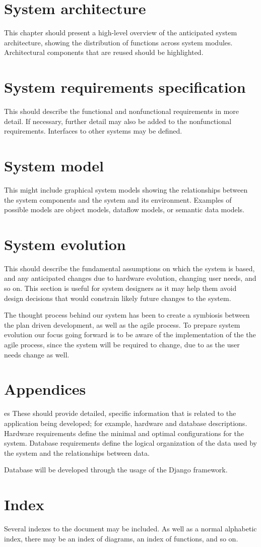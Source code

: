 \documentclass{article}
\begin{document}
\section*{System architecture}
This chapter should present a high-level overview of the anticipated system architecture, showing the
distribution of functions across system modules. Architectural components that are reused should be
highlighted.

\section*{System requirements specification}
This should describe the functional and nonfunctional requirements in more detail. If necessary,
further detail may also be added to the nonfunctional requirements. Interfaces to other systems may be
defined.

\section*{System model}
This might include graphical system models showing the relationships between the system
components and the system and its environment. Examples of possible models are object models, dataflow models, or semantic data models.

\section*{System evolution}
This should describe the fundamental assumptions on which the system is based, and any anticipated
changes due to hardware evolution, changing user needs, and so on. This section is useful for system
designers as it may help them avoid design decisions that would constrain likely future changes to the
system.

The thought process behind our system has been to create a symbiosis between the plan driven development, as well as the agile process. To prepare system evolution our focus going forward is to be aware of the implementation of the the agile process, since the system will be required to change, due to  as the user needs change as well. 

\section*{Appendices}
es These should provide detailed, specific information that is related to the application being
developed; for example, hardware and database descriptions. Hardware requirements define the
minimal and optimal configurations for the system. Database requirements define the logical
organization of the data used by the system and the relationships between data.

Database will be developed through the usage of the Django framework.

\section*{Index}
Several indexes to the document may be included. As well as a normal alphabetic index, there may be
an index of diagrams, an index of functions, and so on.
\end{document}
